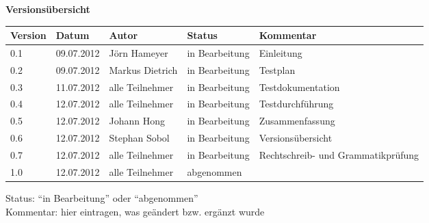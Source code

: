 
{\textbf{Versions\"ubersicht}}\\[2ex]

\begin{longtable}{|m{1.78cm}|m{1.59cm}|m{2.86cm}|m{1.9cm}|m{5.25cm}|}

  \hline                                              %

  \textbf{Version}  &    \textbf{Datum}  &    \textbf{Autor}  &
  \textbf{Status}   &    \textbf{Kommentar}  \\       %
  \hline                                              %

  0.1   & 09.07.2012 & Jörn Hameyer     & in Bearbeitung & Einleitung \\
  \hline
  0.2   & 09.07.2012 & Markus Dietrich  & in Bearbeitung & Testplan \\
  \hline
  0.3   & 11.07.2012 & alle Teilnehmer  & in Bearbeitung & Testdokumentation \\
  \hline
  0.4   & 12.07.2012 & alle Teilnehmer  & in Bearbeitung & Testdurchführung \\
  \hline
  0.5   & 12.07.2012 & Johann Hong      & in Bearbeitung & Zusammenfassung \\
  \hline
  0.6   & 12.07.2012 & Stephan Sobol    & in Bearbeitung & Versionsübersicht \\
  \hline
  0.7   & 12.07.2012 & alle Teilnehmer  & in Bearbeitung & Rechtschreib- und Grammatikprüfung \\
  \hline
  1.0   & 12.07.2012 & alle Teilnehmer  & abgenommen     & \\
  \hline                                              %

\end{longtable}
Status: "`in Bearbeitung"' oder "`abgenommen"'\\
Kommentar: hier eintragen, was ge\"andert bzw. erg\"anzt wurde

